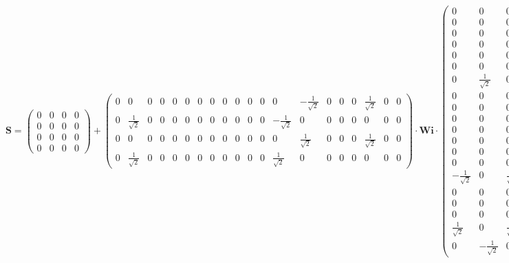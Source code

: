 \[ \mathbf{S} = \left(\begin{array}{cccc} 0 & 0 & 0 & 0 \\ 0 & 0 & 0 &
0 \\ 0 & 0 & 0 & 0 \\ 0 & 0 & 0 & 0 \end{array}\right) +
\left(\begin{array}{cccccccccccccccccccc} 0 & 0 & 0 & 0 & 0 & 0 & 0 &
0 & 0 & 0 & 0 & 0 & 0 & -\frac{1}{\sqrt{2}} & 0 & 0 & 0 &
\frac{1}{\sqrt{2}} & 0 & 0 \\ 0 & \frac{1}{\sqrt{2}} & 0 & 0 & 0 & 0 &
0 & 0 & 0 & 0 & 0 & 0 & -\frac{1}{\sqrt{2}} & 0 & 0 & 0 & 0 & 0 & 0 &
0 \\ 0 & 0 & 0 & 0 & 0 & 0 & 0 & 0 & 0 & 0 & 0 & 0 & 0 &
\frac{1}{\sqrt{2}} & 0 & 0 & 0 & \frac{1}{\sqrt{2}} & 0 & 0 \\ 0 &
\frac{1}{\sqrt{2}} & 0 & 0 & 0 & 0 & 0 & 0 & 0 & 0 & 0 & 0 &
\frac{1}{\sqrt{2}} & 0 & 0 & 0 & 0 & 0 & 0 & 0 \end{array}\right)
\cdot \mathbf{Wi} \cdot\left(\begin{array}{cccc} 0 & 0 & 0 & 0 \\ 0 &
0 & 0 & 0 \\ 0 & 0 & 0 & 0 \\ 0 & 0 & 0 & 0 \\ 0 & 0 & 0 & 0 \\ 0 & 0
& 0 & 0 \\ 0 & \frac{1}{\sqrt{2}} & 0 & \frac{1}{\sqrt{2}} \\ 0 & 0 &
0 & 0 \\ 0 & 0 & 0 & 0 \\ 0 & 0 & 0 & 0 \\ 0 & 0 & 0 & 0 \\ 0 & 0 & 0
& 0 \\ 0 & 0 & 0 & 0 \\ 0 & 0 & 0 & 0 \\ -\frac{1}{\sqrt{2}} & 0 &
\frac{1}{\sqrt{2}} & 0 \\ 0 & 0 & 0 & 0 \\ 0 & 0 & 0 & 0 \\ 0 & 0 & 0
& 0 \\ \frac{1}{\sqrt{2}} & 0 & \frac{1}{\sqrt{2}} & 0 \\ 0 &
-\frac{1}{\sqrt{2}} & 0 & \frac{1}{\sqrt{2}} \end{array}\right) \]

